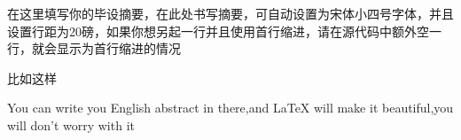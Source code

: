 \documentclass{NCEPUthesis}
\begin{document}


\distanceLogoTitle{2cm}%







\NCEPUcover%
\newpage
\NCEPUabstract

\begin{NCEPUabstracttext}
	在这里填写你的毕设摘要，在此处书写摘要，可自动设置为宋体小四号字体，并且设置行距为20磅，如果你想另起一行并且使用首行缩进，请在源代码中额外空一行，就会显示为首行缩进的情况
	
	比如这样
\end{NCEPUabstracttext}

\begin{NCEPUenabstract}%

You can write you English abstract in there,and LaTeX will make it beautiful,you will don't worry with it
\end{NCEPUenabstract}
\tableofcontents%
\newpage
{}%
\newpage%
\end{document}
